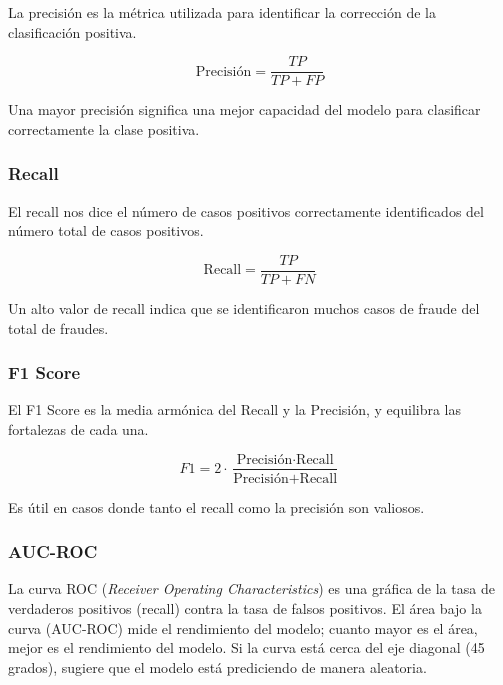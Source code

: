 La precisión es la métrica utilizada para identificar la corrección de la clasificación positiva.

\[
\text{Precisión} = \frac{TP}{TP + FP}
\]

Una mayor precisión significa una mejor capacidad del modelo para clasificar correctamente la clase positiva.

\subsubsection{Recall}

El recall nos dice el número de casos positivos correctamente identificados del número total de casos positivos.

\[
\text{Recall} = \frac{TP}{TP + FN}
\]

Un alto valor de recall indica que se identificaron muchos casos de fraude del total de fraudes.

\subsubsection{F1 Score}

El F1 Score es la media armónica del Recall y la Precisión, y equilibra las fortalezas de cada una.

\[
F1 = 2 \cdot \frac{\text{Precisión} \cdot \text{Recall}}{\text{Precisión} + \text{Recall}}
\]

Es útil en casos donde tanto el recall como la precisión son valiosos.

\subsubsection{AUC-ROC}

La curva ROC (\textit{Receiver Operating Characteristics}) es una gráfica de la tasa de verdaderos positivos (recall) contra la tasa de falsos positivos. El área bajo la curva (AUC-ROC) mide el rendimiento del modelo; cuanto mayor es el área, mejor es el rendimiento del modelo. Si la curva está cerca del eje diagonal (45 grados), sugiere que el modelo está prediciendo de manera aleatoria.


